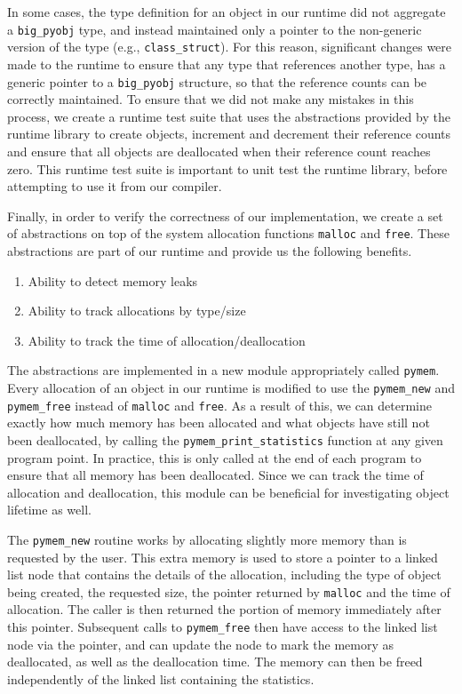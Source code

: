 \documentclass{sigplanconf}
\begin{document}
In some cases, the type definition for an object in our runtime did not aggregate a \texttt{big\_pyobj} type, and instead maintained only a pointer to the non-generic version of the type (e.g., \texttt{class\_struct}).  For this reason, significant changes were made to the runtime to ensure that any type that references another type, has a generic pointer to a \texttt{big\_pyobj} structure, so that the reference counts can be correctly maintained.  To ensure that we did not make any mistakes in this process, we create a runtime test suite that uses the abstractions provided by the runtime library to create objects, increment and decrement their reference counts and ensure that all objects are deallocated when their reference count reaches zero.  This runtime test suite is important to unit test the runtime library, before attempting to use it from our compiler.

Finally, in order to verify the correctness of our implementation, we create a set of abstractions on top of the system allocation functions \texttt{malloc} and \texttt{free}.  These abstractions are part of our runtime and provide us the following benefits. 

\begin{enumerate}
\item Ability to detect memory leaks
\item Ability to track allocations by type/size
\item Ability to track the time of allocation/deallocation
\end{enumerate}

The abstractions are implemented in a new module appropriately called \texttt{pymem}.  Every allocation of an object in our runtime is modified to use the \texttt{pymem\_new} and \texttt{pymem\_free} instead of \texttt{malloc} and \texttt{free}. As a result of this, we can determine exactly how much memory has been allocated and what objects have still not been deallocated, by calling the \texttt{pymem\_print\_statistics} function at any given program point.  In practice, this is only called at the end of each program to ensure that all memory has been deallocated.  Since we can track the time of allocation and deallocation, this module can be beneficial for investigating object lifetime as well.  

The \texttt{pymem\_new} routine works by allocating slightly more memory than is requested by the user.  This extra memory is used to store a pointer to a linked list node that contains the details of the allocation, including the type of object being created, the requested size, the pointer returned by \texttt{malloc} and the time of allocation.  The caller is then returned the portion of memory immediately after this pointer.  Subsequent calls to \texttt{pymem\_free} then have access to the linked list node via the pointer, and can update the node to mark the memory as deallocated, as well as the deallocation time.  The memory can then be freed independently of the linked list containing the statistics. 
\end{document}
